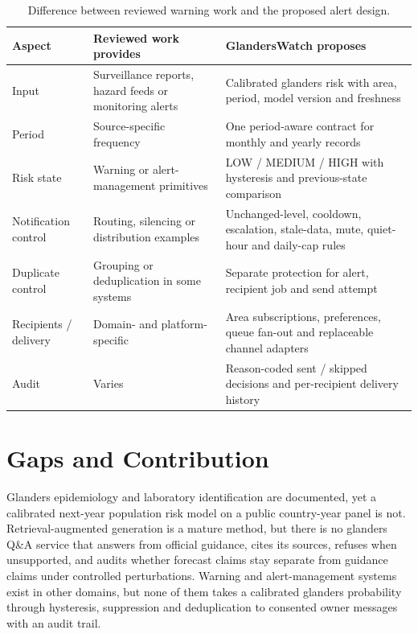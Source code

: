 \documentclass[10pt,openany]{report}
\begin{document}
\begin{table}[htbp]\centering\small
\caption{Difference between reviewed warning work and the proposed alert design.}\label{tab:alert-comparison}
\begin{tabular}{@{}>{\raggedright\arraybackslash}p{2.6cm}
                >{\raggedright\arraybackslash}p{4.9cm}
                >{\raggedright\arraybackslash}p{4.9cm}@{}}
\toprule
\textbf{Aspect} & \textbf{Reviewed work provides} & \textbf{GlandersWatch proposes} \\
\midrule
Input & Surveillance reports, hazard feeds or monitoring alerts & Calibrated glanders risk with area, period, model version and freshness \\
Period & Source-specific frequency & One period-aware contract for monthly and yearly records \\
Risk state & Warning or alert-management primitives & LOW / MEDIUM / HIGH with hysteresis and previous-state comparison \\
Notification control & Routing, silencing or distribution examples & Unchanged-level, cooldown, escalation, stale-data, mute, quiet-hour and daily-cap rules \\
Duplicate control & Grouping or deduplication in some systems & Separate protection for alert, recipient job and send attempt \\
Recipients / delivery & Domain- and platform-specific & Area subscriptions, preferences, queue fan-out and replaceable channel adapters \\
Audit & Varies & Reason-coded sent / skipped decisions and per-recipient delivery history \\
\bottomrule
\end{tabular}
\end{table}

\section{Gaps and Contribution}

Glanders epidemiology and laboratory identification are documented, yet a calibrated next-year
population risk model on a public country-year panel is not. Retrieval-augmented generation is a
mature method, but there is no glanders Q\&A service that answers from official guidance, cites its
sources, refuses when unsupported, and audits whether forecast claims stay separate from guidance
claims under controlled perturbations. Warning and alert-management systems exist in other domains,
but none of them takes a calibrated glanders probability through hysteresis, suppression and
deduplication to consented owner messages with an audit trail.
\end{document}
